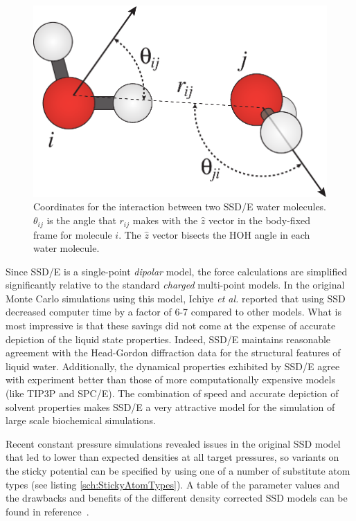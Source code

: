 \documentclass[letterpaper]{report}
\begin{document}
\begin{figure}
\centering
\includegraphics[width=\linewidth]{waterAngle.pdf}
\caption[Coordinate definition for the SSD/E water model]{Coordinates
for the interaction between two SSD/E water molecules.  $\theta_{ij}$
is the angle that $r_{ij}$ makes with the $\hat{z}$ vector in the
body-fixed frame for molecule $i$.  The $\hat{z}$ vector bisects the
HOH angle in each water molecule. } 
\label{fig:ssd}
\end{figure}

Since SSD/E is a single-point {\it dipolar} model, the force
calculations are simplified significantly relative to the standard
{\it charged} multi-point models. In the original Monte Carlo
simulations using this model, Ichiye {\it et al.} reported that using
SSD decreased computer time by a factor of 6-7 compared to other
models.\cite{liu96:new_model} What is most impressive is that these
savings did not come at the expense of accurate depiction of the
liquid state properties.  Indeed, SSD/E maintains reasonable agreement
with the Head-Gordon diffraction data for the structural features of
liquid water.\cite{hura00,liu96:new_model} Additionally, the dynamical
properties exhibited by SSD/E agree with experiment better than those
of more computationally expensive models (like TIP3P and
SPC/E).\cite{chandra99:ssd_md} The combination of speed and accurate
depiction of solvent properties makes SSD/E a very attractive model
for the simulation of large scale biochemical simulations.

Recent constant pressure simulations revealed issues in the original
SSD model that led to lower than expected densities at all target
pressures,\cite{Ichiye03,fennell04} so variants on the sticky
potential can be specified by using one of a number of substitute atom
types (see listing \ref{sch:StickyAtomTypes}).  A table of the
parameter values and the drawbacks and benefits of the different
density corrected SSD models can be found in
reference~.
\end{document}
